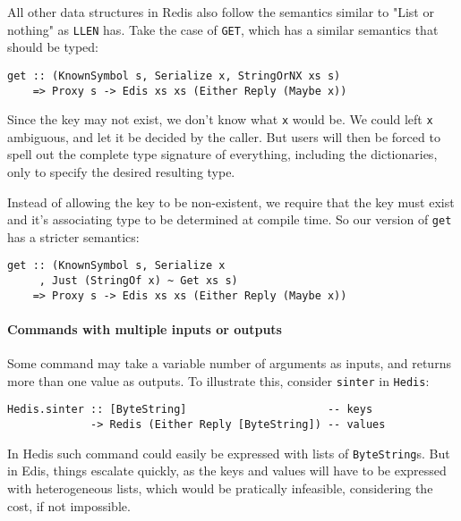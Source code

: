 \documentclass[pldi]{sigplanconf-pldi16}
\begin{document}
All other data structures in Redis also follow the semantics similar to
 "List or nothing" as \texttt{LLEN} has. Take the case of
 \texttt{GET}, which has a similar semantics that should be typed:

\begin{verbatim}
get :: (KnownSymbol s, Serialize x, StringOrNX xs s)
    => Proxy s -> Edis xs xs (Either Reply (Maybe x))
\end{verbatim}

Since the key may not exist, we don't know what \texttt{x} would
be. We could left \texttt{x} ambiguous, and let it be decided by
 the caller. But users will then be forced to spell out the complete
type signature of everything, including the dictionaries, only to specify
the desired resulting type.

Instead of allowing the key to be non-existent, we require that the key must
 exist and it's associating type to be determined at compile time. So our
 version of \texttt{get} has a stricter semantics:

\begin{verbatim}
get :: (KnownSymbol s, Serialize x
     , Just (StringOf x) ~ Get xs s)
    => Proxy s -> Edis xs xs (Either Reply (Maybe x))
\end{verbatim}

\paragraph{Commands with multiple inputs or outputs}

Some command may take a variable number of arguments as inputs, and returns more
 than one value as outputs. To illustrate this, consider
 \texttt{sinter} in \texttt{Hedis}:

\begin{verbatim}
Hedis.sinter :: [ByteString]                      -- keys
             -> Redis (Either Reply [ByteString]) -- values
\end{verbatim}

In Hedis such command could easily be expressed with lists of
 \texttt{ByteString}s. But in Edis, things escalate quickly, as
 the keys and values will have to be expressed with heterogeneous
 lists\cite{hetero}, which would be pratically infeasible, considering the cost,
 if not impossible.
\end{document}
